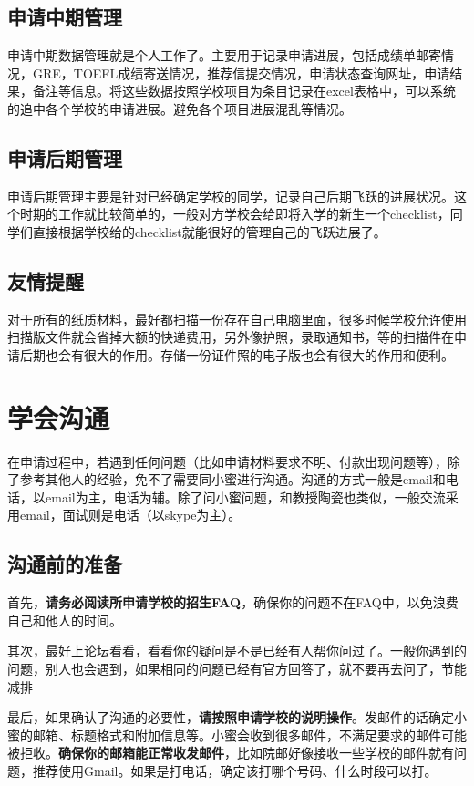\subsection{申请中期管理}
   申请中期数据管理就是个人工作了。主要用于记录申请进展，包括成绩单邮寄情况，GRE，TOEFL成绩寄送情况，推荐信提交情况，申请状态查询网址，申请结果，备注等信息。将这些数据按照学校项目为条目记录在excel表格中，可以系统的追中各个学校的申请进展。避免各个项目进展混乱等情况。

\subsection{申请后期管理}
   申请后期管理主要是针对已经确定学校的同学，记录自己后期飞跃的进展状况。这个时期的工作就比较简单的，一般对方学校会给即将入学的新生一个checklist，同学们直接根据学校给的checklist就能很好的管理自己的飞跃进展了。

\subsection{友情提醒}
对于所有的纸质材料，最好都扫描一份存在自己电脑里面，很多时候学校允许使用扫描版文件就会省掉大额的快递费用，另外像护照，录取通知书，等的扫描件在申请后期也会有很大的作用。存储一份证件照的电子版也会有很大的作用和便利。


\section{学会沟通}
在申请过程中，若遇到任何问题（比如申请材料要求不明、付款出现问题等），除了参考其他人的经验，免不了需要同小蜜进行沟通。沟通的方式一般是email和电话，以email为主，电话为辅。除了问小蜜问题，和教授陶瓷也类似，一般交流采用email，面试则是电话（以skype为主）。
\subsection{沟通前的准备}

首先，\textbf{请务必阅读所申请学校的招生FAQ}，确保你的问题不在FAQ中，以免浪费自己和他人的时间。\par

其次，最好上论坛看看，看看你的疑问是不是已经有人帮你问过了。一般你遇到的问题，别人也会遇到，如果相同的问题已经有官方回答了，就不要再去问了，节能减排~\par

最后，如果确认了沟通的必要性，\textbf{请按照申请学校的说明操作}。发邮件的话确定小蜜的邮箱、标题格式和附加信息等。小蜜会收到很多邮件，不满足要求的邮件可能被拒收。\textbf{确保你的邮箱能正常收发邮件}，比如院邮好像接收一些学校的邮件就有问题，推荐使用Gmail。如果是打电话，确定该打哪个号码、什么时段可以打。

